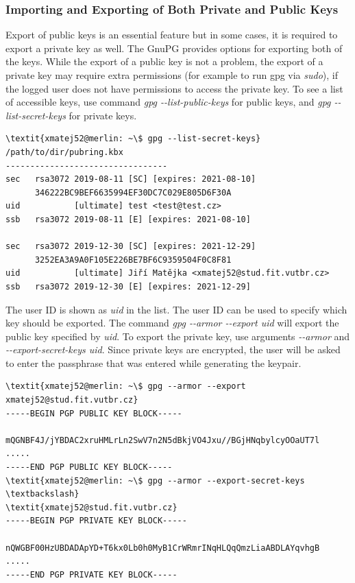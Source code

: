 \subsubsection*{Importing and Exporting of Both Private and Public Keys}
\label{text:keysExport}
Export of public keys is an essential feature but in some cases, it is required to export a private key as well. The GnuPG provides options for exporting both of the keys. While the export of a public key is not a problem, the export of a private key may require extra permissions (for example to run gpg via \textit{sudo}), if the logged user does not have permissions to access the private key. To see a list of accessible keys, use command {\textit{gpg -{}-list-public-keys}} for public keys, and {\textit{gpg -{}-list-secret-keys}} for private keys.
\begin{Verbatim}[commandchars=\\\{\},codes={\catcode`$=3\catcode`_=8},samepage=false,frame=single]
\textit{xmatej52@merlin: ~\$ gpg --list-secret-keys}
/path/to/dir/pubring.kbx
---------------------------------
sec   rsa3072 2019-08-11 [SC] [expires: 2021-08-10]
      346222BC9BEF6635994EF30DC7C029E805D6F30A
uid           [ultimate] test <test@test.cz>
ssb   rsa3072 2019-08-11 [E] [expires: 2021-08-10]

sec   rsa3072 2019-12-30 [SC] [expires: 2021-12-29]
      3252EA3A9A0F105E226BE7BF6C9359504F0C8F81
uid           [ultimate] Jiří Matějka <xmatej52@stud.fit.vutbr.cz>
ssb   rsa3072 2019-12-30 [E] [expires: 2021-12-29]
\end{Verbatim}

The user ID is shown as \textit{uid} in the list. The user ID can be used to specify which key should be exported. The command {\textit{gpg -{}-armor -{}-export uid}} will export the public key specified by \textit{uid}. To export the private key, use arguments {\textit{-{}-armor}} and \\  {\textit{-{}-export-secret-keys uid}}. Since private keys are encrypted, the user will be asked to enter the passphrase that was entered while generating the keypair.
\begin{Verbatim}[commandchars=\\\{\},codes={\catcode`$=3\catcode`_=8},samepage=false,frame=single]
\textit{xmatej52@merlin: ~\$ gpg --armor --export xmatej52@stud.fit.vutbr.cz}
-----BEGIN PGP PUBLIC KEY BLOCK-----

mQGNBF4J/jYBDAC2xruHMLrLn2SwV7n2N5dBkjVO4Jxu//BGjHNqbylcyOOaUT7l
.....
-----END PGP PUBLIC KEY BLOCK-----
\textit{xmatej52@merlin: ~\$ gpg --armor --export-secret-keys \textbackslash}
\textit{xmatej52@stud.fit.vutbr.cz}
-----BEGIN PGP PRIVATE KEY BLOCK-----

nQWGBF00HzUBDADApYD+T6kx0Lb0h0MyB1CrWRmrINqHLQqQmzLiaABDLAYqvhgB
.....
-----END PGP PRIVATE KEY BLOCK-----
\end{Verbatim}

